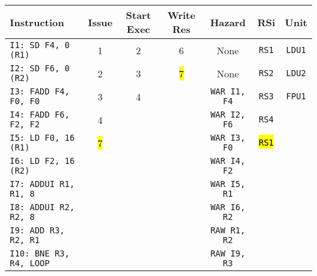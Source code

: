 \begin{enumerate}
    \begin{table}[!htp]
        \centering
        \begin{adjustbox}{width={\textwidth},totalheight={\textheight},keepaspectratio}
        \begin{tabular}{@{} l c c c c c c @{}}
            \toprule
            \textbf{Instruction} & \textbf{Issue} & \textbf{Start Exec} & \textbf{Write Res} & \textbf{Hazard} & \textbf{RSi} & \textbf{Unit} \\
            \midrule
            \texttt{I1: SD F4, 0 (R1)}      & 1 & 2 & 6 & None  & \texttt{RS1}   & \texttt{LDU1}  \\ [.5em]
            \texttt{I2: SD F6, 0 (R2)}      & 2 & 3 & \hl{7} & None  & \texttt{RS2}   & \texttt{LDU2}  \\ [.5em]
            \texttt{I3: FADD F4, F0, F0}    & 3 & 4 &   & \texttt{WAR I1, F4}  & \texttt{RS3} & \texttt{FPU1} \\ [.5em]
            \texttt{I4: FADD F6, F2, F2}    & 4 &   &   & \texttt{WAR I2, F6} & \texttt{RS4} &       \\ [.5em]
            \texttt{I5: LD F0, 16 (R1)}     & \hl{7} &   &   & \texttt{WAR I3, F0} & \hl{\texttt{RS1}} &       \\ [.5em]
            \texttt{I6: LD F2, 16 (R2)}     &   &   &   & \texttt{WAR I4, F2} &       &       \\ [.5em]
            \texttt{I7: ADDUI R1, R1, 8}    &   &   &   & \texttt{WAR I5, R1} &       &       \\ [.5em]
            \texttt{I8: ADDUI R2, R2, 8}    &   &   &   & \texttt{WAR I6, R2} &       &       \\ [.5em]
            \texttt{I9: ADD R3, R2, R1}     &   &   &   & \texttt{RAW R1, R2} &       &       \\ [.5em]
            \texttt{I10: BNE R3, R4, LOOP}   &   &   &   & \texttt{RAW I9, R3} &       &       \\
            \bottomrule
        \end{tabular}
        \end{adjustbox}
    \end{table}
    

\end{enumerate}
